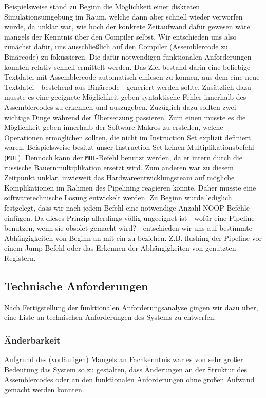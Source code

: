 \documentclass[paper=a4,fontsize=12pt,twocolumn]{scrreprt}
\begin{document}
Beispielsweise stand zu Beginn die Möglichkeit einer diskreten Simulationsumgebung im Raum, welche dann aber schnell wieder verworfen wurde, da unklar war, wie hoch der konkrete Zeitaufwand dafür gewesen wäre mangels der Kenntnis über den Compiler selbst.
Wir entschieden uns also zunächst dafür, uns ausschließlich auf den Compiler (Assemblercode zu Binärcode) zu fokussieren.
Die dafür notwendigen funktionalen Anforderungen konnten relativ schnell ermittelt werden.
Das Ziel bestand darin eine beliebige Textdatei mit Assemblercode automatisch einlesen zu können, aus dem eine neue Textdatei - bestehend aus Binärcode - generiert werden sollte.
Zusätzlich dazu musste es eine geeignete Möglichkeit geben syntaktische Fehler innerhalb des Assemblercodes zu erkennen und auszugeben.
Zuzüglich dazu sollten zwei wichtige Dinge während der Übersetzung passieren.
Zum einen musste es die Möglichkeit geben innerhalb der Software Makros zu erstellen, welche Operationen ermöglichen sollten, die nicht im Instruction Set explizit definiert waren.
Beispielsweise besitzt unser Instruction Set keinen Multiplikationsbefehl (\texttt{MUL}).
Dennoch kann der \texttt{MUL}-Befehl benutzt werden, da er intern durch die russische Bauernmultiplikation ersetzt wird.
Zum anderen war zu diesem Zeitpunkt unklar, inwieweit das Hardwareentwicklungsteam auf mögliche Komplikationen im Rahmen des Pipelining reagieren konnte.
Daher musste eine softwaretechnische Lösung entwickelt werden.
Zu Beginn wurde lediglich festgelegt, dass wir nach jedem Befehl eine notwendige Anzahl NOOP-Befehle einfügen.
Da dieses Prinzip allerdings völlig ungeeignet ist - wofür eine Pipeline benutzen, wenn sie obsolet gemacht wird? - entschieden wir uns auf bestimmte Abhängigkeiten von Beginn an mit ein zu beziehen.
Z.B. flushing der Pipeline vor einem Jump-Befehl oder das Erkennen der Abhängigkeiten von genutzten Registern.

\subsection{Technische Anforderungen}
Nach Fertigstellung der funktionalen Anforderungsanalyse gingen wir dazu über, eine Liste an technischen Anforderungen des Systems zu entwerfen.

\subsubsection{Änderbarkeit}
Aufgrund des (vorläufigen) Mangels an Fachkenntnis war es von sehr großer Bedeutung das System so zu gestalten, dass Änderungen an der Struktur des Assemblercodes oder an den funktionalen Anforderungen ohne großen Aufwand gemacht werden konnten.
\end{document}
